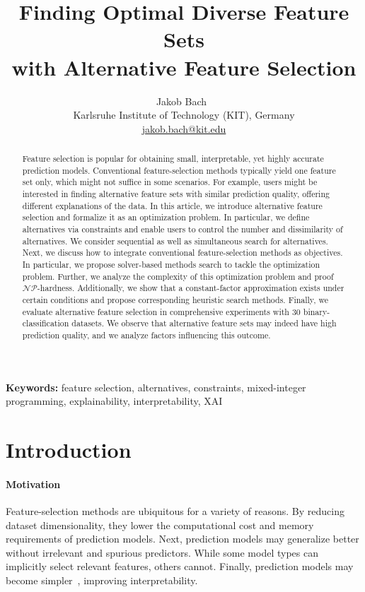 \documentclass{article}
\title{
	Finding Optimal Diverse Feature Sets\texorpdfstring{\\}{ }with Alternative Feature Selection
}
\author{
	Jakob Bach~\orcidlink{0000-0003-0301-2798}\\
	\small Karlsruhe Institute of Technology (KIT), Germany\\
	\small \href{mailto:jakob.bach@kit.edu}{jakob.bach@kit.edu}
}
\date{} %
\theoremstyle{definition}
\begin{document}
\maketitle

\begin{abstract}
Feature selection is popular for obtaining small, interpretable, yet highly accurate prediction models.
Conventional feature-selection methods typically yield one feature set only, which might not suffice in some scenarios.
For example, users might be interested in finding alternative feature sets with similar prediction quality, offering different explanations of the data.
In this article, we introduce alternative feature selection and formalize it as an optimization problem.
In particular, we define alternatives via constraints and enable users to control the number and dissimilarity of alternatives.
We consider sequential as well as simultaneous search for alternatives.
Next, we discuss how to integrate conventional feature-selection methods as objectives.
In particular, we propose solver-based methods search to tackle the optimization problem.
Further, we analyze the complexity of this optimization problem and proof $\mathcal{NP}$-hardness.
Additionally, we show that a constant-factor approximation exists under certain conditions and propose corresponding heuristic search methods.
Finally, we evaluate alternative feature selection in comprehensive experiments with 30 binary-classification datasets.
We observe that alternative feature sets may indeed have high prediction quality, and we analyze factors influencing this outcome.
\end{abstract}
%
\textbf{Keywords:} feature selection, alternatives, constraints, mixed-integer programming, explainability, interpretability, XAI

\section{Introduction}
\label{sec:afs:introduction}

\paragraph{Motivation}

Feature-selection methods are ubiquitous for a variety of reasons.
By reducing dataset dimensionality, they lower the computational cost and memory requirements of prediction models.
Next, prediction models may generalize better without irrelevant and spurious predictors.
While some model types can implicitly select relevant features, others cannot.
Finally, prediction models may become simpler~\cite{li2017feature}, improving interpretability.
\end{document}
